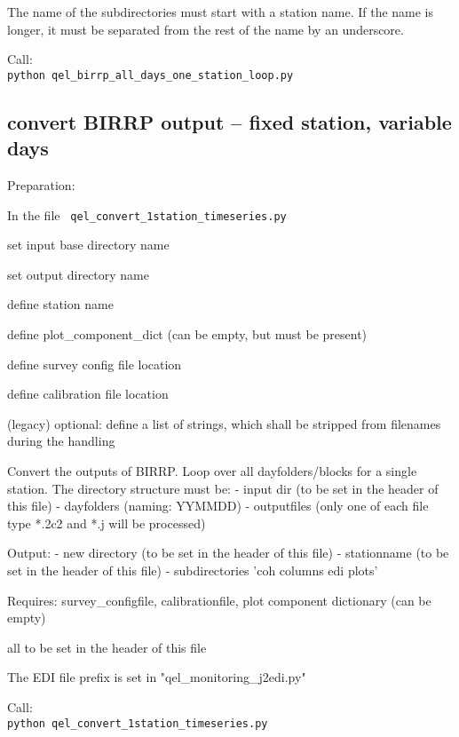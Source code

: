 \documentclass[11pt,DIV=12]{scrartcl}
\begin{document}
The name of the subdirectories must start with a station name. If the name is 
longer, it must be  separated from the rest of the name by an underscore.


Call:\\

\texttt{python qel\_birrp\_all\_days\_one\_station\_loop.py }


\subsection{convert BIRRP output -- fixed station, variable days }

Preparation:


In the file \texttt{ qel\_convert\_1station\_timeseries.py}
\begin{itemize*}
\item set input base directory name 
\item set output directory name
\item define station name
\item define plot\_component\_dict (can be empty, but must be present)
\item define survey config file location
\item define calibration file location
\item (legacy) optional: define a list of strings, which shall be stripped from filenames during the handling 
\end{itemize*}

Convert the outputs of BIRRP. Loop over all dayfolders/blocks for a single 
station. The directory structure must be:
- input dir (to be set in the header of this file)
 - dayfolders (naming: YYMMDD)
     - outputfiles (only one of each file type *.2c2 and *.j will be processed)

Output:
- new directory (to be set in the header of this file)
    - stationname (to be set in the header of this file)
        - subdirectories 'coh columns edi plots'


Requires: 
survey\_configfile, 
calibrationfile,
plot component dictionary (can be empty)
 
 all to be set in the header of this file


The EDI file prefix is set in  "qel\_monitoring\_j2edi.py"


Call:\\

\texttt{python qel\_convert\_1station\_timeseries.py}
\end{document}
